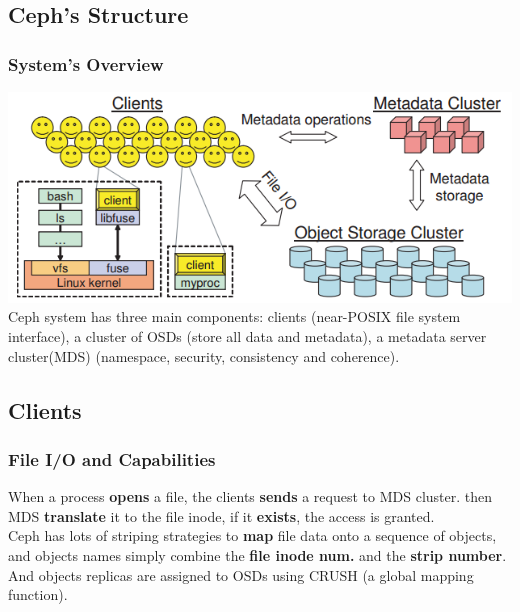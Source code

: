 \documentclass[cjk,slidestop,mathserif]{beamer}
\begin{document}
\begin{CJK}{UTF8}{gkai}
\section{Ceph's Structure}
\begin{frame}
 \frametitle{System's Overview}
 \vspace{6pt}
 \includegraphics[width=\textwidth]{p1.png} \\
 Ceph system has three main components: clients (near-POSIX file system interface), 
 a cluster of OSDs (store all data and metadata), 
 a metadata server cluster(MDS) (namespace, security, consistency and coherence). 
\end{frame}

\subsection{Clients}
\begin{frame}
 \frametitle{File I/O and Capabilities}
 \vspace{12pt}
 When a process \textbf{opens} a file, the clients \textbf{sends} a request to MDS cluster. 
 then MDS \textbf{translate} it to the file inode, if it \textbf{exists}, the access is granted. \\
 
 \vspace{8pt}
 Ceph has lots of striping strategies to \textbf{map} file data onto a sequence of objects, and objects names simply 
 combine the \textbf{file inode num.} and the \textbf{strip number}. And objects replicas are assigned to OSDs using CRUSH (a 
 global mapping function).
\end{frame}


\end{CJK}
\end{document}
